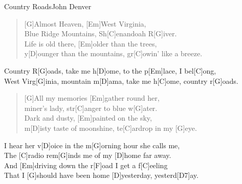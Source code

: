 \begin{song}{Country Roads}{John Denver}

        \begin{verse}
            [G]Almost Heaven, [Em]West Virginia, \\
            [D]Blue Ridge Mountains, Sh[C]enandoah R[G]iver. \\
            [G]Life is old there, [Em]older than the trees, \\
            y[D]ounger than the mountains, gr[C]owin' like a breeze.
        \end{verse}

        \begin{chorus}
            Country R[G]oads, take me h[D]ome, 
            to the p[Em]lace, I bel[C]ong, \\
            West Virg[G]inia, mountain m[D]ama, 
            take me h[C]ome, country r[G]oads.
        \end{chorus}

        \begin{verse}
            [G]All my memories [Em]gather round her, \\
            [D]miner's lady, str[C]anger to blue w[G]ater. \\
            [G]Dark and dusty, [Em]painted on the sky, \\
            m[D]isty taste of moonshine, te[C]ardrop in my [G]eye. 
        \end{verse}


        \begin{bridge}
            [Em]I hear her v[D]oice in the m[G]orning hour she calls me, \\
            The [C]radio rem[G]inds me of my [D]home far away. \\
            And [Em]driving down the r[F]oad I get a f[C]eeling \\
            That I [G]should have been home [D]yesterday, yesterd[D7]ay.
        \end{bridge}


\end{song}
